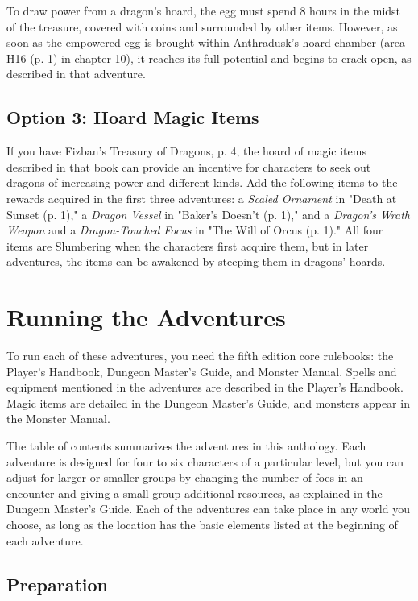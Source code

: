 \documentclass[letterpaper, 11pt, twocolumn]{dndbook}
\begin{document}
To draw power from a dragon's hoard, the egg must spend 8 hours in the midst of the treasure, covered with coins and surrounded by other items. However, as soon as the empowered egg is brought within Anthradusk's hoard chamber (area H16 (p. 1) in chapter 10), it reaches its full potential and begins to crack open, as described in that adventure.

\subsection{Option 3: Hoard Magic Items}

If you have Fizban's Treasury of Dragons, p. 4, the hoard of magic items described in that book can provide an incentive for characters to seek out dragons of increasing power and different kinds. Add the following items to the rewards acquired in the first three adventures: a \textit{Scaled Ornament} in "Death at Sunset (p. 1)," a \textit{Dragon Vessel} in "Baker's Doesn't (p. 1)," and a \textit{Dragon's Wrath Weapon} and a \textit{Dragon-Touched Focus} in "The Will of Orcus (p. 1)." All four items are Slumbering when the characters first acquire them, but in later adventures, the items can be awakened by steeping them in dragons' hoards.
\section{Running the Adventures}

To run each of these adventures, you need the fifth edition core rulebooks: the Player's Handbook, Dungeon Master's Guide, and Monster Manual. Spells and equipment mentioned in the adventures are described in the Player's Handbook. Magic items are detailed in the Dungeon Master's Guide, and monsters appear in the Monster Manual.

The table of contents summarizes the adventures in this anthology. Each adventure is designed for four to six characters of a particular level, but you can adjust for larger or smaller groups by changing the number of foes in an encounter and giving a small group additional resources, as explained in the Dungeon Master's Guide. Each of the adventures can take place in any world you choose, as long as the location has the basic elements listed at the beginning of each adventure.

\subsection{Preparation}
\end{document}
